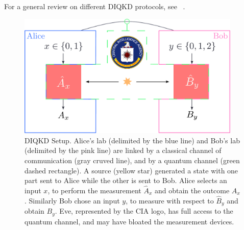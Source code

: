 For a general review on different DIQKD protocols, see ~\cite{Primaatmaja2023}.


\begin{figure}
	\begin{center}
		\includegraphics[width=0.95\textwidth]{chapters/deviceindependent/img/setup.pdf}
	\end{center}
	\caption{DIQKD Setup. Alice's lab (delimited by the blue line) and Bob's lab (delimited by the pink line) are linked by a classical channel of communication (gray cruved line), and by a quantum channel (green dashed rectangle). A source (yellow star) generated a state with one part sent to Alice while the other is sent to Bob. Alice selects an input $x$, to perform the measurement $\hat{A}_x$ and obtain the outcome $A_x$. Similarly Bob chose an input $y$, to measure with respect to $\hat{B}_y$ and obtain $B_y$.
	Eve, represented by the CIA logo, has full access to the quantum channel, and may have bloated the measurement devices. }
	\label{fig:DIQKD_setup}
\end{figure}

